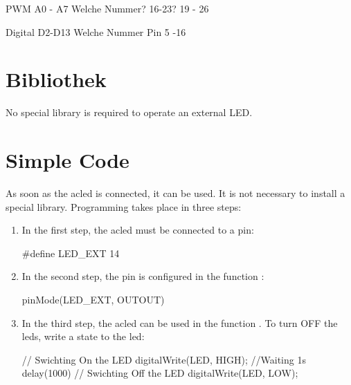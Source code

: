 PWM  A0 - A7 Welche Nummer? 16-23? 19 - 26

Digital D2-D13 Welche Nummer Pin 5 -16




\section{Bibliothek}

No special library is required to operate an external LED.



\section{Simple Code}


As soon as the ac{led} is connected, it can be used. It is not necessary to install a special library.
Programming takes place in three steps:

\begin{enumerate}
    \item In the first step, the ac{led} must be connected to a pin:
    
    {
        \begin{Arduino}
            #define LED_EXT 14
        \end{Arduino}
    }
    \item In the second step, the pin is configured in the function :
    
    {
        \begin{Arduino}
            pinMode(LED_EXT, OUTOUT)   
        \end{Arduino}
    }
    \item In the third step, the ac{led} can be used in the function . To turn OFF the \ac{led}s, write a state  to the \ac{led}:
    
    {
        \begin{Arduino}
            // Swichting On the LED        
            digitalWrite(LED, HIGH); 
            //Waiting 1s
            delay(1000)
            // Swichting Off the LED
            digitalWrite(LED, LOW);
        \end{Arduino}
    }
    
\end{enumerate}



